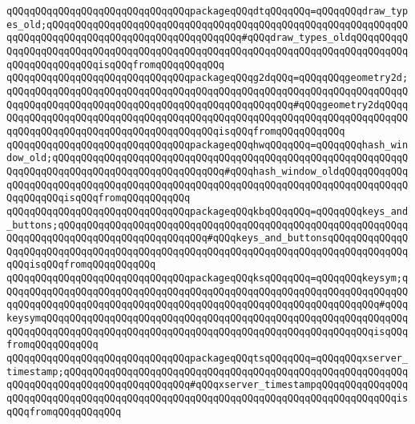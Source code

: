 \verb|qQQqqQQqqQQqqQQqqQQqqQQqqQQqqQQqpackageqQQqdtqQQqqQQq=qQQqqQQqdraw_types_old;qQQqqQQqqQQqqQQqqQQqqQQqqQQqqQQqqQQqqQQqqQQqqQQqqQQqqQQqqQQqqQQqqQQqqQQqqQQqqQQqqQQqqQQqqQQqqQQqqQQqqQQq#qQQqdraw_types_oldqQQqqQQqqQQqqQQqqQQqqQQqqQQqqQQqqQQqqQQqqQQqqQQqqQQqqQQqqQQqqQQqqQQqqQQqqQQqqQQqqQQqqQQqqQQqqQQqisqQQqfromqQQqqQQqqQQq|\newline
\verb|qQQqqQQqqQQqqQQqqQQqqQQqqQQqqQQqpackageqQQqg2dqQQq=qQQqqQQqgeometry2d;qQQqqQQqqQQqqQQqqQQqqQQqqQQqqQQqqQQqqQQqqQQqqQQqqQQqqQQqqQQqqQQqqQQqqQQqqQQqqQQqqQQqqQQqqQQqqQQqqQQqqQQqqQQqqQQqqQQqqQQq#qQQqgeometry2dqQQqqQQqqQQqqQQqqQQqqQQqqQQqqQQqqQQqqQQqqQQqqQQqqQQqqQQqqQQqqQQqqQQqqQQqqQQqqQQqqQQqqQQqqQQqqQQqqQQqqQQqqQQqqQQqisqQQqfromqQQqqQQqqQQq|\newline
\verb|qQQqqQQqqQQqqQQqqQQqqQQqqQQqqQQqpackageqQQqhwqQQqqQQq=qQQqqQQqhash_window_old;qQQqqQQqqQQqqQQqqQQqqQQqqQQqqQQqqQQqqQQqqQQqqQQqqQQqqQQqqQQqqQQqqQQqqQQqqQQqqQQqqQQqqQQqqQQqqQQqqQQq#qQQqhash_window_oldqQQqqQQqqQQqqQQqqQQqqQQqqQQqqQQqqQQqqQQqqQQqqQQqqQQqqQQqqQQqqQQqqQQqqQQqqQQqqQQqqQQqqQQqqQQqisqQQqfromqQQqqQQqqQQq|\newline
\verb|qQQqqQQqqQQqqQQqqQQqqQQqqQQqqQQqpackageqQQqkbqQQqqQQq=qQQqqQQqkeys_and_buttons;qQQqqQQqqQQqqQQqqQQqqQQqqQQqqQQqqQQqqQQqqQQqqQQqqQQqqQQqqQQqqQQqqQQqqQQqqQQqqQQqqQQqqQQqqQQqqQQq#qQQqkeys_and_buttonsqQQqqQQqqQQqqQQqqQQqqQQqqQQqqQQqqQQqqQQqqQQqqQQqqQQqqQQqqQQqqQQqqQQqqQQqqQQqqQQqqQQqqQQqisqQQqfromqQQqqQQqqQQq|\newline
\verb|qQQqqQQqqQQqqQQqqQQqqQQqqQQqqQQqpackageqQQqksqQQqqQQq=qQQqqQQqkeysym;qQQqqQQqqQQqqQQqqQQqqQQqqQQqqQQqqQQqqQQqqQQqqQQqqQQqqQQqqQQqqQQqqQQqqQQqqQQqqQQqqQQqqQQqqQQqqQQqqQQqqQQqqQQqqQQqqQQqqQQqqQQqqQQqqQQqqQQq#qQQqkeysymqQQqqQQqqQQqqQQqqQQqqQQqqQQqqQQqqQQqqQQqqQQqqQQqqQQqqQQqqQQqqQQqqQQqqQQqqQQqqQQqqQQqqQQqqQQqqQQqqQQqqQQqqQQqqQQqqQQqqQQqqQQqqQQqisqQQqfromqQQqqQQqqQQq|\newline
\verb|qQQqqQQqqQQqqQQqqQQqqQQqqQQqqQQqpackageqQQqtsqQQqqQQq=qQQqqQQqxserver_timestamp;qQQqqQQqqQQqqQQqqQQqqQQqqQQqqQQqqQQqqQQqqQQqqQQqqQQqqQQqqQQqqQQqqQQqqQQqqQQqqQQqqQQqqQQqqQQq#qQQqxserver_timestampqQQqqQQqqQQqqQQqqQQqqQQqqQQqqQQqqQQqqQQqqQQqqQQqqQQqqQQqqQQqqQQqqQQqqQQqqQQqqQQqqQQqisqQQqfromqQQqqQQqqQQq|\newline
